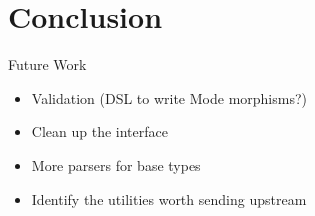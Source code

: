 \documentclass[dvipsnames]{beamer}
\begin{document}
\section{Conclusion}

\begin{frame}{Future Work}
  \begin{itemize}
    \item Validation (DSL to write Mode morphisms?)
    \item Clean up the interface
    \item More parsers for base types
    \item Identify the utilities worth sending upstream
  \end{itemize}
\end{frame}
\end{document}
